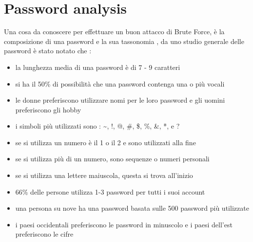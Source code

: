 \section{Password analysis}
Una cosa da conoscere per effettuare un buon attacco di Brute Force, è la composizione di una password e la sua tassonomia \cite{hashcrack}, da uno studio generale delle password è stato notato che :
\begin{itemize}
    \item la lunghezza media di una password è di 7 - 9 caratteri
    \item si ha il 50\% di possibilità che una password contenga una o più vocali
    \item le donne preferiscono utilizzare nomi per le loro password e gli uomini preferiscono gli hobby
    \item i simboli più utilizzati sono : \textasciitilde, !, @, \#, \$, \%, \&, *, e ?
    \item se si utilizza un numero è il 1 o il 2 e sono utilizzati alla fine
    \item se si utilizza più di un numero, sono sequenze o numeri personali
    \item se si utilizza una lettere maiuscola, questa si trova all'inizio
    \item 66\% delle persone utilizza 1-3 password per tutti i suoi account
    \item una persona su nove ha una password basata sulle 500 password più utilizzate
    \item i paesi occidentali preferiscono le password in minuscolo e i paesi dell'est preferiscono le cifre
\end{itemize}

